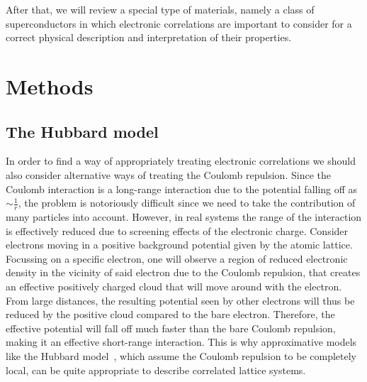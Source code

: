 \documentclass[a4paper,openright,twoside,12pt]{book}
\numberwithin{equation}{section}
\begin{document}
After that, we will review a special type of materials, namely a class of 
superconductors in which electronic correlations are important to consider for a correct physical
description and interpretation of their properties. 

\chapter{Methods}
\section{The Hubbard model}
In order to find a way of appropriately treating electronic correlations we should also consider alternative ways
of treating the Coulomb repulsion. Since the Coulomb interaction is a long-range interaction due to the potential
falling off as $\sim \frac{1}{r}$, the problem is notoriously difficult since we need to take the contribution
of many particles into account. However, in real systems the range of the interaction is effectively reduced due
to screening effects of the electronic charge. Consider electrons moving in a positive background potential given
by the atomic lattice. Focussing on a specific electron, one will observe a region of reduced electronic density 
in the vicinity of said electron due to the Coulomb repulsion, that creates an effective positively charged
cloud that will move around with the electron. From large distances, the resulting potential seen
by other electrons will thus be reduced by the positive cloud compared to the bare electron.
Therefore, the effective potential will fall off much faster than the bare Coulomb repulsion,
making it an effective short-range interaction. This is why approximative
models like the Hubbard model~\cite{Gutzwiller1963,Hubbard1963,Kanamori1963}, which assume the Coulomb repulsion
to be completely local, can be quite appropriate to describe correlated lattice systems.
\end{document}
